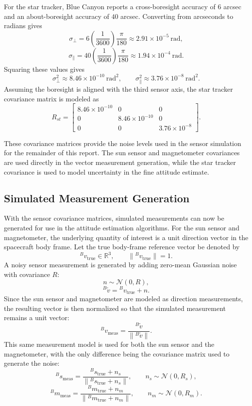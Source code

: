 \documentclass[12pt]{article}
\begin{document}
For the star tracker, Blue Canyon reports a cross-boresight accuracy of \(6\) arcsec and an about-boresight accuracy of \(40\) arcsec. Converting from arcseconds to radians gives
\[
\sigma_{\perp} = 6\left(\frac{1}{3600}\right)\frac{\pi}{180}
\approx 2.91\times 10^{-5}\ \text{rad},
\]
\[
\sigma_{\parallel} = 40\left(\frac{1}{3600}\right)\frac{\pi}{180}
\approx 1.94\times 10^{-4}\ \text{rad}.
\]
Squaring these values gives
\[
\sigma_{\perp}^2 \approx 8.46\times 10^{-10}\ \text{rad}^2,
\qquad
\sigma_{\parallel}^2 \approx 3.76\times 10^{-8}\ \text{rad}^2.
\]
Assuming the boresight is aligned with the third sensor axis, the star tracker covariance matrix is modeled as
\[
R_{st}
=
\begin{bmatrix}
8.46\times 10^{-10} & 0 & 0 \\
0 & 8.46\times 10^{-10} & 0 \\
0 & 0 & 3.76\times 10^{-8}
\end{bmatrix}.
\]

These covariance matrices provide the noise levels used in the sensor simulation for the remainder of this report. The sun sensor and magnetometer covariances are used directly in the vector measurement generation, while the star tracker covariance is used to model uncertainty in the fine attitude estimate.

\subsection{Simulated Measurement Generation}

With the sensor covariance matrices, simulated measurements can now be generated for use in the attitude estimation algorithms. For the sun sensor and magnetometer, the underlying quantity of interest is a unit direction vector in the spacecraft body frame. Let the true body-frame reference vector be denoted by
\[
{}^{B}v_{\text{true}} \in \mathbb{R}^3,
\qquad
\|{}^{B}v_{\text{true}}\| = 1.
\]
A noisy sensor measurement is generated by adding zero-mean Gaussian noise with covariance \(R\):
\[
n \sim \mathcal{N}(0,R),
\]
\[
{}^{B}\tilde{v} = {}^{B}v_{\text{true}} + n.
\]
Since the sun sensor and magnetometer are modeled as direction measurements, the resulting vector is then normalized so that the simulated measurement remains a unit vector:
\[
{}^{B}v_{\text{meas}}
=
\frac{{}^{B}\tilde{v}}{\|{}^{B}\tilde{v}\|}.
\]
This same measurement model is used for both the sun sensor and the magnetometer, with the only difference being the covariance matrix used to generate the noise:
\[
{}^{B}s_{\text{meas}}
=
\frac{{}^{B}s_{\text{true}} + n_s}{\|{}^{B}s_{\text{true}} + n_s\|},
\qquad
n_s \sim \mathcal{N}(0,R_s),
\]
\[
{}^{B}m_{\text{meas}}
=
\frac{{}^{B}m_{\text{true}} + n_m}{\|{}^{B}m_{\text{true}} + n_m\|},
\qquad
n_m \sim \mathcal{N}(0,R_m).
\]
\end{document}
